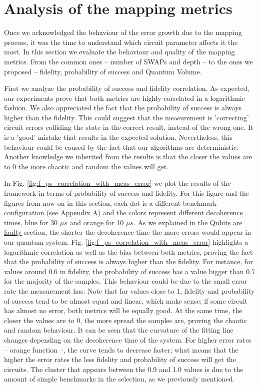 \section{Analysis of the mapping metrics}
\label{sec:org2c64a48}
Once we acknowledged the behaviour of the error growth due to the mapping process, it was the time to understand which circuit parameter affects it the most.
In this section we evaluate the behaviour and quality of the mapping metrics.
From the common ones -- number of SWAPs and depth -- to the ones we proposed -- fidelity, probability of success and Quantum Volume.



First we analyze the probability of success and fidelity correlation.
As expected, our experiments prove that both metrics are highly correlated in a logarithmic fashion.
We also appreciated the fact that the probability of success is always higher than the fidelity.
This could suggest that the measurement is 'correcting' circuit errors colliding the state in the correct result, instead of the wrong one.
It is a 'good' mistake that results in the expected solution.
Nevertheless, this behaviour could be caused by the fact that our algorithms are deterministic.
Another knowledge we inherited from the results is that the closer the values are to 0 the more chaotic and random the values will get.



In Fig. \ref{fig:f_ps_correlation_with_meas_error} we plot the results of the framework in terms of probability of success and fidelity. 
For this figure and the figures from now on in this section, each dot is a different benchmark configuration (see \href{appendix-1.org}{Appendix A}) and the colors represent different decoherence times, blue for 30 \(\mu s\) and orange for 10 \(\mu s\).
As we explained in the \href{quantum_computing.org}{Qubits are faulty} section, the shorter the decoherence time the more errors would appear in our quantum system.
Fig. \ref{fig:f_ps_correlation_with_meas_error} highlights a logarithmic correlation as well as the bias between both metrics, proving the fact that the probability of success is always higher than the fidelity.
For instance, for values around 0.6 in fidelity, the probability of success has a value bigger than 0.7 for the majority of the samples.
This behaviour could be due to the small error rate the measurement has.
Note that for values close to 1, fidelity and probability of success tend to be almost equal and linear, which make sense; if some circuit has almost no error, both metrics will be equally good.
At the same time, the closer the values are to 0, the more spread the samples are, proving the chaotic and random behaviour.
It can be seen that the curvature of the fitting line changes depending on the decoherence time of the system.
For higher error rates -- orange function --, the curve tends to decrease faster; what means that the higher the error rates the less fidelity and probability of success will get the circuits.
The cluster that appears between the 0.9 and 1.0 values is due to the amount of simple benchmarks in the selection, as we previously mentioned.

